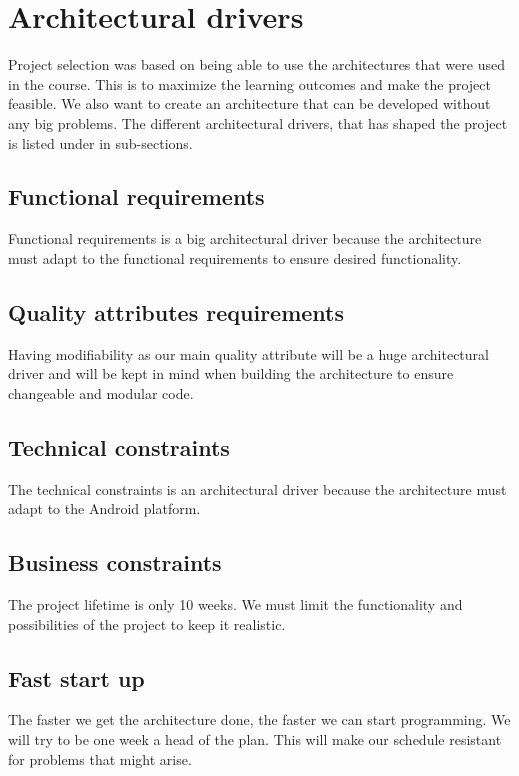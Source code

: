 \pagebreak
\section{Architectural drivers}
Project selection was based on being able to use the architectures that were used in the course. This is to maximize the learning outcomes and make the project feasible. We also want to create an architecture that can be developed without any big problems. The different architectural drivers, that has shaped the project is listed under in sub-sections.

\subsection{Functional requirements}
Functional requirements is a big architectural driver because the architecture must adapt to the functional requirements to ensure desired functionality.
 
\subsection{Quality attributes requirements}
Having modifiability as our main quality attribute will be a huge architectural driver and will be kept in mind when building the architecture to ensure changeable and modular code.

\subsection{Technical constraints}
The technical constraints is an architectural driver because the architecture must adapt to the Android platform.

\subsection{Business constraints}
The project lifetime is only 10 weeks. We must limit the functionality and possibilities of the project to keep it realistic.

\subsection{Fast start up}
The faster we get the architecture done, the faster we can start programming. We will try to be one week a head of the plan. This will make our schedule resistant for problems that might arise.



